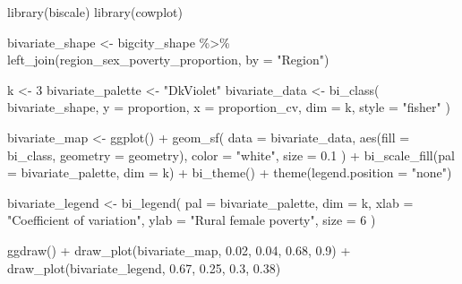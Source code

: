 \documentclass[
  spanish,
  11pt,
  letterpaper,
  oneside,
  open=any]{scrbook}
\newenvironment{Shaded}{\begin{snugshade}}{\end{snugshade}}
\newcommand{\AttributeTok}[1]{\textcolor[rgb]{0.40,0.45,0.13}{#1}}
\newcommand{\DecValTok}[1]{\textcolor[rgb]{0.68,0.00,0.00}{#1}}
\newcommand{\FloatTok}[1]{\textcolor[rgb]{0.68,0.00,0.00}{#1}}
\newcommand{\FunctionTok}[1]{\textcolor[rgb]{0.28,0.35,0.67}{#1}}
\newcommand{\NormalTok}[1]{\textcolor[rgb]{0.00,0.23,0.31}{#1}}
\newcommand{\OtherTok}[1]{\textcolor[rgb]{0.00,0.23,0.31}{#1}}
\newcommand{\SpecialCharTok}[1]{\textcolor[rgb]{0.37,0.37,0.37}{#1}}
\newcommand{\StringTok}[1]{\textcolor[rgb]{0.13,0.47,0.30}{#1}}
\newcounter{none} %
\begin{document}
\begin{Shaded}
\begin{Highlighting}[]
\FunctionTok{library}\NormalTok{(biscale)}
\FunctionTok{library}\NormalTok{(cowplot)}

\NormalTok{bivariate\_shape }\OtherTok{\textless{}{-}}\NormalTok{ bigcity\_shape }\SpecialCharTok{\%\textgreater{}\%}
  \FunctionTok{left\_join}\NormalTok{(region\_sex\_poverty\_proportion, }\AttributeTok{by =} \StringTok{"Region"}\NormalTok{)}

\NormalTok{k }\OtherTok{\textless{}{-}} \DecValTok{3}
\NormalTok{bivariate\_palette }\OtherTok{\textless{}{-}} \StringTok{"DkViolet"}
\NormalTok{bivariate\_data }\OtherTok{\textless{}{-}} \FunctionTok{bi\_class}\NormalTok{(}
\NormalTok{  bivariate\_shape,}
  \AttributeTok{y =}\NormalTok{ proportion,}
  \AttributeTok{x =}\NormalTok{ proportion\_cv,}
  \AttributeTok{dim =}\NormalTok{ k,}
  \AttributeTok{style =} \StringTok{"fisher"}
\NormalTok{)}

\NormalTok{bivariate\_map }\OtherTok{\textless{}{-}} \FunctionTok{ggplot}\NormalTok{() }\SpecialCharTok{+}
  \FunctionTok{geom\_sf}\NormalTok{(}
    \AttributeTok{data =}\NormalTok{ bivariate\_data,}
    \FunctionTok{aes}\NormalTok{(}\AttributeTok{fill =}\NormalTok{ bi\_class, }\AttributeTok{geometry =}\NormalTok{ geometry),}
    \AttributeTok{color =} \StringTok{"white"}\NormalTok{,}
    \AttributeTok{size =} \FloatTok{0.1}
\NormalTok{  ) }\SpecialCharTok{+}
  \FunctionTok{bi\_scale\_fill}\NormalTok{(}\AttributeTok{pal =}\NormalTok{ bivariate\_palette, }\AttributeTok{dim =}\NormalTok{ k) }\SpecialCharTok{+}
  \FunctionTok{bi\_theme}\NormalTok{() }\SpecialCharTok{+}
  \FunctionTok{theme}\NormalTok{(}\AttributeTok{legend.position =} \StringTok{"none"}\NormalTok{)}

\NormalTok{bivariate\_legend }\OtherTok{\textless{}{-}} \FunctionTok{bi\_legend}\NormalTok{(}
  \AttributeTok{pal =}\NormalTok{ bivariate\_palette,}
  \AttributeTok{dim =}\NormalTok{ k,}
  \AttributeTok{xlab =} \StringTok{"Coefficient of variation"}\NormalTok{,}
  \AttributeTok{ylab =} \StringTok{"Rural female poverty"}\NormalTok{,}
  \AttributeTok{size =} \DecValTok{6}
\NormalTok{)}

\FunctionTok{ggdraw}\NormalTok{() }\SpecialCharTok{+}
  \FunctionTok{draw\_plot}\NormalTok{(bivariate\_map, }\FloatTok{0.02}\NormalTok{, }\FloatTok{0.04}\NormalTok{, }\FloatTok{0.68}\NormalTok{, }\FloatTok{0.9}\NormalTok{) }\SpecialCharTok{+}
  \FunctionTok{draw\_plot}\NormalTok{(bivariate\_legend, }\FloatTok{0.67}\NormalTok{, }\FloatTok{0.25}\NormalTok{, }\FloatTok{0.3}\NormalTok{, }\FloatTok{0.38}\NormalTok{)}
\end{Highlighting}
\end{Shaded}
\end{document}
